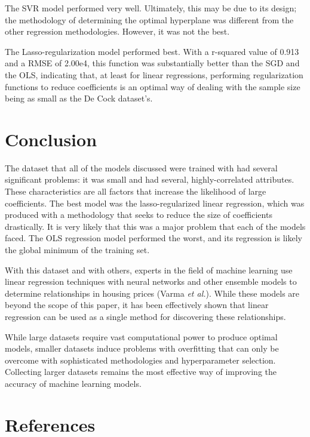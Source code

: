 \documentclass[12pt]{article}
\begin{document}
\par The SVR model performed very well. Ultimately, this may be due to its design; the methodology of determining the optimal hyperplane was different from the other regression methodologies. However, it was not the best.
\par The Lasso-regularization model performed best. With a r-squared value of 0.913 and a RMSE of 2.00e4, this function was substantially better than the SGD and the OLS, indicating that, at least for linear regressions, performing regularization functions to reduce coefficients is an optimal way of dealing with the sample size being as small as the De Cock dataset’s.

\section*{Conclusion}
\par \qquad The dataset that all of the models discussed were trained with had several significant problems: it was small and had several, highly-correlated attributes. These characteristics are all factors that increase the likelihood of large coefficients. The best model was the lasso-regularized linear regression, which was produced with a methodology that seeks to reduce the size of coefficients drastically. It is very likely that this was a major problem that each of the models faced. The OLS regression model performed the worst, and its regression is likely the global minimum of the training set.
\par With this dataset and with others, experts in the field of machine learning use linear regression techniques with neural networks and other ensemble models to determine relationships in housing prices (Varma \emph{et al.}). While these models are beyond the scope of this paper, it has been effectively shown that linear regression can be used as a single method for discovering these relationships.
\par While large datasets require vast computational power to produce optimal models, smaller datasets induce problems with overfitting that can only be overcome with sophisticated methodologies and hyperparameter selection. Collecting larger datasets remains the most effective way of improving the accuracy of machine learning models.

\section*{References}
\begingroup
\noindent
\vspace{-3em}
\setlength{\parindent}{-0.5in}
\setlength{\leftskip}{0.5in}
\setlength{\parskip}{10pt}
\end{document}
